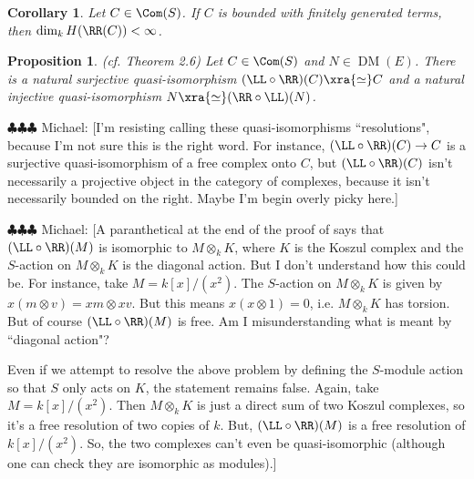 \documentclass[12pt]{amsart}
\newtheorem{prop}[lemma]{Proposition}
\newtheorem{cor}[lemma]{Corollary}
\theoremstyle{definition}
\theoremstyle{remark}
\newcommand{\michael}[1]{{\color{red} \sf $\clubsuit\clubsuit\clubsuit$ Michael: [#1]}}
\def\DM{\operatorname{DM}}
\begin{document}
\begin{cor}\label{cor:RM high degree} Let $C \in \Com(S)$. If $C$ is bounded with finitely generated terms, then $\dim_kH(\RR(C)) < \infty$.
\end{cor}


\begin{prop}(cf. \cite{EFS} Theorem 2.6)
\label{resolutions}
Let $C \in \Com(S)$ and $N \in \DM(E)$. There is a natural surjective quasi-isomorphism $(\LL \circ \RR)(C) \xra{\simeq} C$ and a natural injective quasi-isomorphism $N \xra{\simeq} (\RR \circ \LL)(N)$.
\end{prop}

\michael{I'm resisting calling these quasi-isomorphisms ``resolutions", because I'm not sure this is the right word. For instance, $(\LL \circ \RR)(C) \to C$ is a surjective quasi-isomorphism of a free complex onto $C$, but $(\LL \circ \RR)(C)$ isn't necessarily a projective object in the category of complexes, because it isn't necessarily bounded on the right. Maybe I'm begin overly picky here.}

\michael{A paranthetical at the end of the proof of \cite[Theorem 2.6]{EFS} says that $(\LL \circ \RR)(M)$ is isomorphic to $M \otimes_k K$, where $K$ is the Koszul complex and the $S$-action on $M \otimes_k K$ is the diagonal action. But I don't understand how this could be. For instance, take $M = k[x]/(x^2)$. The $S$-action on $M \otimes_k K$ is given by $x(m \otimes v) = xm \otimes xv$. But this means $x (x \otimes 1) = 0$, i.e. $M \otimes_k K$ has torsion. But of course $(\LL \circ \RR)(M)$ is free. Am I misunderstanding what is meant by ``diagonal action"?

Even if we attempt to resolve the above problem by defining the $S$-module action so that $S$ only acts on $K$, the statement remains false. Again, take $M = k[x]/(x^2)$. Then $M \otimes_k K$ is just a direct sum of two Koszul complexes, so it's a free resolution of two copies of $k$. But, $(\LL \circ \RR) (M)$ is a free resolution of $k[x]/(x^2)$. So, the two complexes can't even be quasi-isomorphic (although one can check they are isomorphic as modules).}
\end{document}
